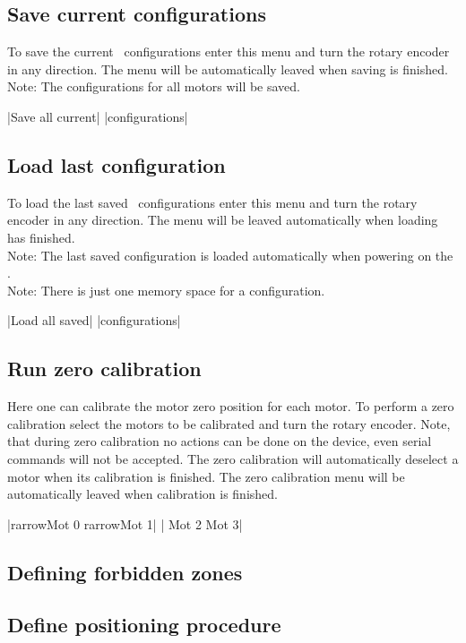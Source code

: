
\subsection{Save current configurations}
\label{menu_save}
To save the current \productName ~configurations enter this menu and
turn the rotary encoder in any direction. The menu will be automatically
leaved when saving is finished.\\
Note: The configurations for all motors will be saved.
\begin{center}
  |Save all current|
             |configurations|
\end{center}


\subsection{Load last configuration}
To load the last saved \productName ~configurations enter this menu
and turn the rotary encoder in any direction. The menu will be leaved
automatically when loading has
finished.\\
Note: The last saved configuration is loaded automatically when
powering on the \productName.\\
Note: There is just one memory space for a configuration.
\begin{center}
  |Load all saved|
             |configurations|
\end{center}


\subsection{Run zero calibration}
\label{menu_zero_cal}
Here one can calibrate the motor zero position for each motor. To
perform a zero calibration select the motors to be calibrated and
turn the rotary encoder. Note, that during zero calibration no actions
can be done on the device, even serial commands will not be accepted.
The zero calibration will automatically deselect a motor when its
calibration is finished. The zero calibration menu will be automatically
leaved when calibration is finished.
\begin{center}
  |{rarrow}Mot 0  {rarrow}Mot 1|
             | Mot 2   Mot 3|
\end{center}


\subsection{Defining forbidden zones}

\subsection{Define positioning procedure}









\newpage
